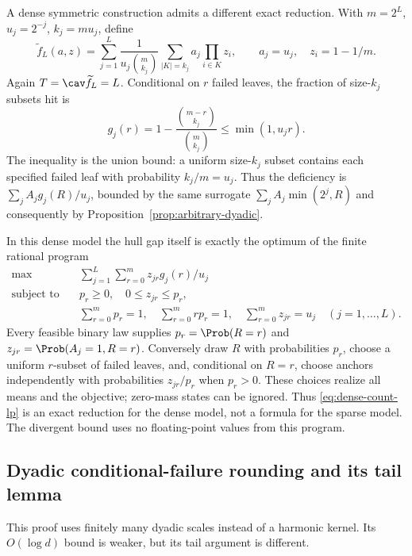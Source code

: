 A dense symmetric construction admits a different exact reduction.
With $m=2^L$, $u_j=2^{-j}$, $k_j=mu_j$, define
\begin{equation}\label{eq:dense-predecessor}
 \widetilde f_L(a,z)=\sum_{j=1}^L\frac1{u_j\binom m{k_j}}
             \sum_{|K|=k_j}a_j\prod_{i\in K}z_i,
 \qquad a_j=u_j,\quad z_i=1-1/m.
\end{equation}
Again $T=\cav\widetilde f_L=L$. Conditional on $r$ failed leaves, the
fraction of size-$k_j$ subsets hit is
\[
 g_j(r)=1-\frac{\binom{m-r}{k_j}}{\binom m{k_j}}
       \le\min(1,u_jr).
\]
The inequality is the union bound: a uniform size-$k_j$ subset contains
each specified failed leaf with probability $k_j/m=u_j$.
Thus the deficiency is $\sum_j A_jg_j(R)/u_j$, bounded by the same
surrogate $\sum_j A_j\min(2^j,R)$ and consequently by
Proposition~\ref{prop:arbitrary-dyadic}.

In this dense model the hull gap itself is exactly the optimum of the
finite rational program
\begin{equation}\label{eq:dense-count-lp}
 \begin{aligned}
 \max\quad&\sum_{j=1}^L\sum_{r=0}^m z_{jr}g_j(r)/u_j\\
 \text{subject to}\quad& p_r\ge0,\quad 0\le z_{jr}\le p_r,\\
 &\sum_{r=0}^mp_r=1,\quad \sum_{r=0}^mrp_r=1,
       \quad\sum_{r=0}^mz_{jr}=u_j\quad(j=1,\ldots,L).
 \end{aligned}
\end{equation}
Every feasible binary law supplies $p_r=\Prob(R=r)$ and
$z_{jr}=\Prob(A_j=1,R=r)$. Conversely draw $R$ with probabilities $p_r$,
choose a uniform $r$-subset of failed leaves, and, conditional on $R=r$,
choose anchors independently with probabilities $z_{jr}/p_r$ when
$p_r>0$. These choices realize all means and the objective; zero-mass
states can be ignored. Thus \eqref{eq:dense-count-lp} is an exact reduction
for the dense model, not a formula for the sparse model. The divergent
bound uses no floating-point values from this program.

\subsection{Dyadic conditional-failure rounding and its tail lemma}
\label{app:dyadic-rounding}
This proof uses finitely many dyadic scales instead of a harmonic
kernel. Its $O(\log d)$ bound is weaker, but its tail argument is
different.

